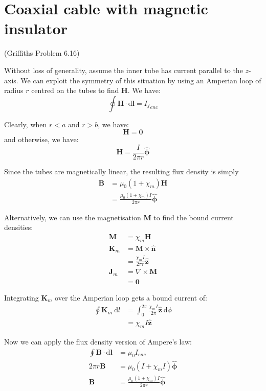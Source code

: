 \documentclass[a4paper]{scrartcl}
\begin{document}
\section{Coaxial cable with magnetic insulator}
(Griffiths Problem 6.16)

Without loss of generality, assume the inner tube has current parallel to the \(z\)-axis. We can exploit the symmetry of this situation by using an Amperian loop of radius \(r\) centred on the tubes to find \(\mathbf{H}\). We have:
\[\oint \mathbf{H} \cdot \mathrm{d}\mathbf{l} = {I_f}_{enc}\]

Clearly, when \(r < a\) and \(r > b\), we have:
\[\mathbf{H} = \mathbf{0}\]
and otherwise, we have:
\[\mathbf{H} = \frac{I}{2 \pi r} \hat{\boldsymbol{\phi}}\]

Since the tubes are magnetically linear, the resulting flux density is simply
\begin{align*}
    \mathbf{B} &= \mu_0 (1 + \chi_m) \mathbf{H} \\
    &= \frac{\mu_0 (1 + \chi_m) I}{2 \pi r} \hat{\boldsymbol{\phi}}
\end{align*}

Alternatively, we can use the magnetisation \(\mathbf{M}\) to find the bound current densities:
\begin{align*}
    \mathbf{M} &= \chi_m \mathbf{H} \\
    \mathbf{K}_m &= \mathbf{M} \times \hat{\mathbf{n}} \\
    &= \frac{\chi_m I}{2 \pi r} \hat{\mathbf{z}} \\
    \mathbf{J}_m &= \nabla \times \mathbf{M} \\
    &= \mathbf{0}
\end{align*}

Integrating \(\mathbf{K}_m\) over the Amperian loop gets a bound current of:
\begin{align*}
    \oint \mathbf{K}_m \:\mathrm{d}l &= \int_0^{2 \pi} \frac{\chi_m I}{2 \pi} \hat{\mathbf{z}} \:\mathrm{d}\phi \\
    &= \chi_m I \hat{\mathbf{z}}
\end{align*}

Now we can apply the flux density version of Ampere's law:
\begin{align*}
    \oint \mathbf{B} \cdot \mathrm{d}\mathbf{l} &= \mu_0 I_{enc} \\
    2 \pi r \mathbf{B} &= \mu_0 (I + \chi_m I) \hat{\boldsymbol{\phi}} \\
    \mathbf{B} &= \frac{\mu_0 (1 + \chi_m) I}{2 \pi r} \hat{\boldsymbol{\phi}}
\end{align*}
\end{document}
